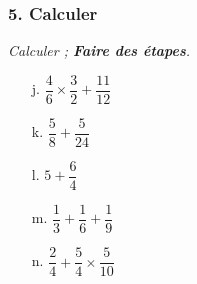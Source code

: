\newpage
\subsubsection*{5. Calculer}
\textit{Calculer ; \textbf{Faire des étapes}.}

\begin{multicols}{5}
\begin{enumerate}
  \item[j.] $\dfrac{4}{6} \times \dfrac{3}{2} + \dfrac{11}{12}$
  \item[k.] $\dfrac{5}{8} + \dfrac{5}{24}$
  \item[l.] $5 + \dfrac{6}{4}$
  \item[m.] $\dfrac{1}{3} + \dfrac{1}{6} + \dfrac{1}{9}$
  \item[n.] $\dfrac{2}{4} + \dfrac{5}{4} \times \dfrac{5}{10}$
\end{enumerate}
\end{multicols}

\Pointilles[48]
